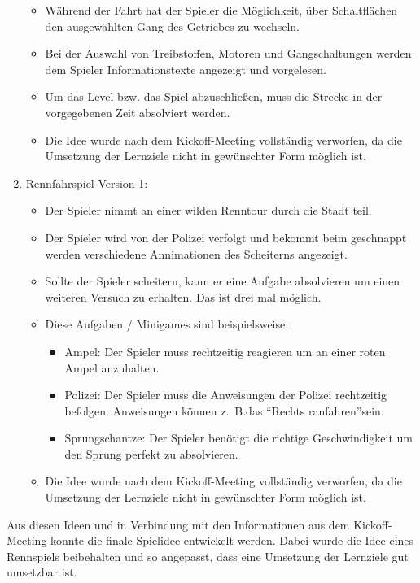 \begin{enumerate}
\begin{itemize}
			\item{Während der Fahrt hat der Spieler die Möglichkeit, über Schaltflächen den ausgewählten Gang des Getriebes zu wechseln.}
			\item{Bei der Auswahl von Treibstoffen, Motoren und Gangschaltungen werden dem Spieler Informationstexte angezeigt und vorgelesen.}
			\item{Um das Level bzw. das Spiel abzuschließen, muss die Strecke in der vorgegebenen Zeit absolviert werden.}
			\item{Die Idee wurde nach dem Kickoff-Meeting vollständig verworfen, da die Umsetzung der Lernziele nicht in gewünschter Form möglich ist.}
		\end{itemize}
		\item{Rennfahrspiel Version 1:}
		\begin{itemize}
			\item{Der Spieler nimmt an einer wilden Renntour durch die Stadt teil.}
			\item{Der Spieler wird von der Polizei verfolgt und bekommt beim geschnappt werden verschiedene Annimationen des Scheiterns angezeigt.}
			\item{Sollte der Spieler scheitern, kann er eine Aufgabe absolvieren um einen weiteren Versuch zu erhalten. Das ist drei mal möglich.}
			\item{Diese Aufgaben / Minigames sind beispielsweise:}
			\begin{itemize}
				\item{Ampel: Der Spieler muss rechtzeitig reagieren um an einer roten Ampel anzuhalten.}
				\item{Polizei: Der Spieler muss die Anweisungen der Polizei rechtzeitig befolgen. Anweisungen können z.~B.\@ das \enquote{Rechts ranfahren}sein.}
				\item{Sprungschantze: Der Spieler benötigt die richtige Geschwindigkeit um den Sprung perfekt zu absolvieren.}
			\end{itemize}
			\item{Die Idee wurde nach dem Kickoff-Meeting vollständig verworfen, da die Umsetzung der Lernziele nicht in gewünschter Form möglich ist.}
		\end{itemize}
	\end{enumerate}
	Aus diesen Ideen und in Verbindung mit den Informationen aus dem Kickoff-Meeting konnte die finale Spielidee entwickelt werden. Dabei wurde die Idee eines Rennspiels beibehalten und so angepasst, dass eine Umsetzung der Lernziele gut umsetzbar ist.
